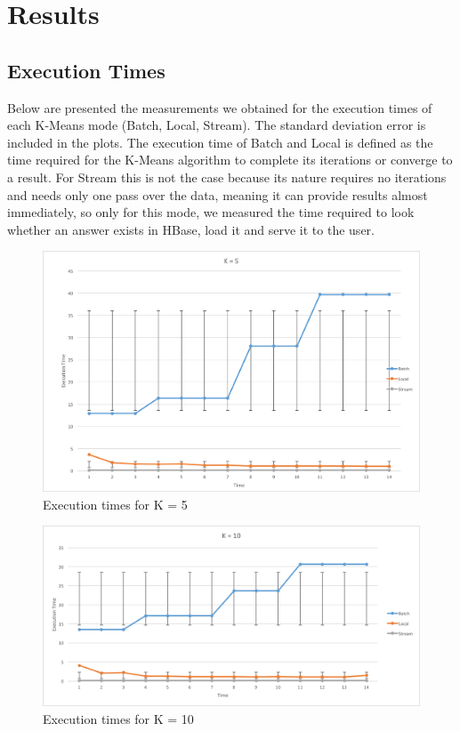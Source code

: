 \documentclass{lmproj}
\begin{document}
\section{Results}
\label{evaluation}

\subsection{Execution Times}
Below are presented the measurements we obtained for the execution times of each K-Means mode (Batch, Local, Stream). The standard deviation error is included in the plots. The execution time of Batch and Local is defined as the time required for the K-Means algorithm to complete its iterations or converge to a result. For Stream this is not the case because its nature requires no iterations and needs only one pass over the data, meaning it can provide results almost immediately, so only for this mode, we measured the time required to look whether an answer exists in HBase, load it and serve it to the user.

\bigskip

\begin{figure}[H]
	\centering	
	\includegraphics[scale=0.5]{execution_time/execution_time_k_5}
	\caption{Execution times for K = 5}
\end{figure}

\begin{figure}[H]
	\centering	
	\includegraphics[scale=0.5]{execution_time/execution_time_k_10}
	\caption{Execution times for K = 10}
\end{figure}
\end{document}
